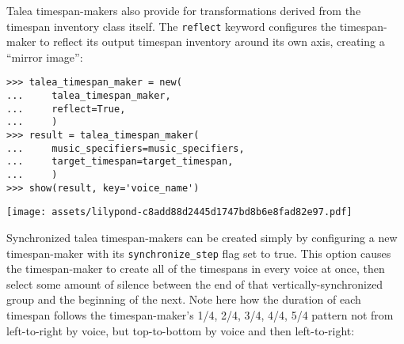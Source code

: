 \noindent Talea timespan-makers also provide for transformations derived from
the timespan inventory class itself. The \texttt{reflect} keyword configures
the timespan-maker to reflect its output timespan inventory around its own
axis, creating a \enquote{mirror image}:

\begin{comment}
<abjad>
talea_timespan_maker = new(
    talea_timespan_maker,
    reflect=True,
    )
result = talea_timespan_maker(
    music_specifiers=music_specifiers,
    target_timespan=target_timespan,
    )
show(result, key='voice_name')
</abjad>
\end{comment}

\begin{abjadbookoutput}
\begin{singlespacing}
\vspace{-0.5\baselineskip}
\begin{lstlisting}
>>> talea_timespan_maker = new(
...     talea_timespan_maker,
...     reflect=True,
...     )
>>> result = talea_timespan_maker(
...     music_specifiers=music_specifiers,
...     target_timespan=target_timespan,
...     )
>>> show(result, key='voice_name')
\end{lstlisting}
\noindent\texttt{[image: assets/lilypond-c8add88d2445d1747bd8b6e8fad82e97.pdf]}
\end{singlespacing}
\end{abjadbookoutput}

\noindent Synchronized talea timespan-makers can be created simply by
configuring a new timespan-maker with its \texttt{synchronize\_step} flag set
to true. This option causes the timespan-maker to create all of the timespans
in every voice at once, then select some amount of silence between the end of
that vertically-synchronized group and the beginning of the next. Note here how
the duration of each timespan follows the timespan-maker's 1/4, 2/4, 3/4, 4/4,
5/4 pattern not from left-to-right by voice, but top-to-bottom by voice and
then left-to-right:

\begin{comment}
<abjad>
synchronized_talea_timespan_maker = consort.TaleaTimespanMaker(
    playing_talea=rhythmmakertools.Talea(
        counts=(1, 2, 3, 4, 5),
        denominator=8,
        ),
    silence_talea=rhythmmakertools.Talea(
        counts=(4, 7),
        denominator=8,
        ),
    synchronize_step=True,
    )
result = synchronized_talea_timespan_maker(
    music_specifiers=music_specifiers,
    target_timespan=target_timespan,
    )
show(result, key='voice_name')
</abjad>
\end{comment}

